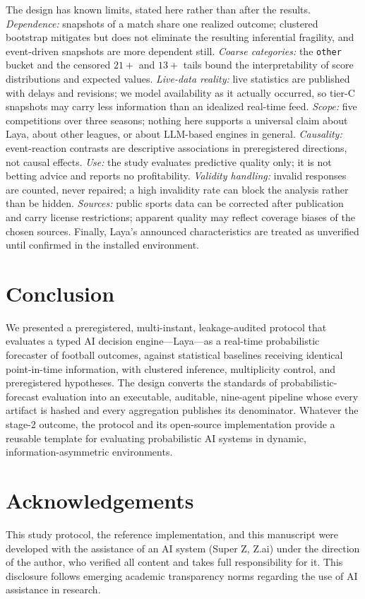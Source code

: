 \documentclass[11pt]{article}
\begin{document}
The design has known limits, stated here rather than after the results.
\emph{Dependence:} snapshots of a match share one realized outcome; clustered
bootstrap mitigates but does not eliminate the resulting inferential
fragility, and event-driven snapshots are more dependent still.
\emph{Coarse categories:} the \texttt{other} bucket and the censored $21+$ and
$13+$ tails bound the interpretability of score distributions and expected
values. \emph{Live-data reality:} live statistics are published with delays
and revisions; we model availability as it actually occurred, so tier-C
snapshots may carry less information than an idealized real-time feed.
\emph{Scope:} five competitions over three seasons; nothing here supports a
universal claim about Laya, about other leagues, or about LLM-based engines
in general. \emph{Causality:} event-reaction contrasts are descriptive
associations in preregistered directions, not causal effects. \emph{Use:}
the study evaluates predictive quality only; it is not betting advice and
reports no profitability. \emph{Validity handling:} invalid responses are
counted, never repaired; a high invalidity rate can block the analysis
rather than be hidden. \emph{Sources:} public sports data can be corrected
after publication and carry license restrictions; apparent quality may
reflect coverage biases of the chosen sources. Finally, Laya's announced
characteristics are treated as unverified until confirmed in the installed
environment.

\section{Conclusion}
\label{sec:conclusion}

We presented a preregistered, multi-instant, leakage-audited protocol that
evaluates a typed AI decision engine---Laya---as a real-time probabilistic
forecaster of football outcomes, against statistical baselines receiving
identical point-in-time information, with clustered inference, multiplicity
control, and preregistered hypotheses. The design converts the standards of
probabilistic-forecast evaluation into an executable, auditable, nine-agent
pipeline whose every artifact is hashed and every aggregation publishes its
denominator. Whatever the stage-2 outcome, the protocol and its open-source
implementation provide a reusable template for evaluating probabilistic AI
systems in dynamic, information-asymmetric environments.

\section*{Acknowledgements}
This study protocol, the reference implementation, and this manuscript were
developed with the assistance of an AI system (Super Z, Z.ai) under the
direction of the author, who verified all content and takes full
responsibility for it. This disclosure follows emerging academic transparency
norms regarding the use of AI assistance in research.
\end{document}
